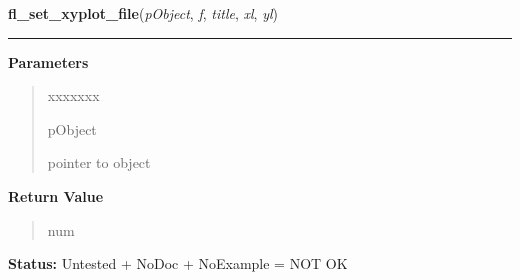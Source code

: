 \hspace{.8\funcindent}\begin{boxedminipage}{\funcwidth}

    \raggedright \textbf{fl\_set\_xyplot\_file}(\textit{pObject}, \textit{f}, \textit{title}, \textit{xl}, \textit{yl})

    \vspace{-1.5ex}

    \rule{\textwidth}{0.5\fboxrule}
\setlength{\parskip}{2ex}
\setlength{\parskip}{1ex}
      \textbf{Parameters}
      \vspace{-1ex}

      \begin{quote}
        \begin{Ventry}{xxxxxxx}

          \item[pObject]

          pointer to object

        \end{Ventry}

      \end{quote}

      \textbf{Return Value}
    \vspace{-1ex}

      \begin{quote}
      num

      \end{quote}

\textbf{Status:} Untested + NoDoc + NoExample = NOT OK



    \end{boxedminipage}

    \label{xformslib:library:fl_insert_xyplot_data}

    \vspace{0.5ex}

